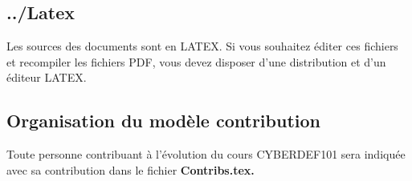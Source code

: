 %
%
%
%


\subsection{../Latex}

Les sources des documents sont en LATEX. Si vous souhaitez éditer ces fichiers et recompiler les fichiers PDF, vous devez disposer d'une distribution et d'un éditeur LATEX.




\subsection{Organisation du modèle contribution}

Toute personne contribuant à l'évolution du cours CYBERDEF101 sera indiquée avec sa contribution dans le fichier \bf{Contribs.tex}.


